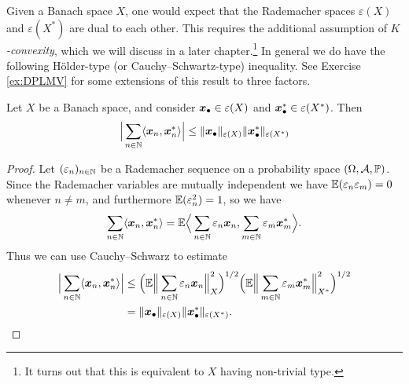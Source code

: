 Given a Banach space $X$, one would expect that the Rademacher spaces $\varepsilon(X)$ and $\varepsilon(X^{*})$ are dual to each other.
This requires the additional assumption of \emph{$K$-convexity}, which we will discuss in a later chapter.\footnote{It turns out that this is equivalent to $X$ having non-trivial type.}
In general we do have the following H\"older-type (or Cauchy--Schwartz-type) inequality.
See Exercise \ref{ex:DPLMV} for some extensions of this result to three factors.

\begin{prop}
  Let $X$ be a Banach space, and consider $\bm{x}_{\bullet} \in \varepsilon(X)$ and $\bm{x}_{\bullet}^{*} \in \varepsilon(X^{*})$.
  Then
  \begin{equation*}
    \Big| \sum_{n \in \mathbb{N}} \langle \bm{x}_{n}, \bm{x}_{n}^{*} \rangle \Big| \leq \|\bm{x}_{\bullet}\|_{\varepsilon(X)} \|\bm{x}_{\bullet}^{*}\|_{\varepsilon(X^{*})} 
  \end{equation*}
\end{prop}

\begin{proof}
  Let $(\varepsilon_{n})_{n \in \mathbb{N}}$ be a Rademacher sequence on a probability space $(\Omega,\mathcal{A},\mathbb{P})$.
  Since the Rademacher variables are mutually independent we have $\mathbb{E}(\varepsilon_{n} \varepsilon_m) = 0$ whenever $n \neq m$, and furthermore $\mathbb{E}(\varepsilon_{n}^{2}) = 1$, so we have
  \begin{equation*}
    \sum_{n \in \mathbb{N}} \langle \bm{x}_{n}, \bm{x}_{n}^{*} \rangle
    = \mathbb{E} \Big\langle \sum_{n \in \mathbb{N}} \varepsilon_{n} \bm{x}_{n}, \sum_{m \in \mathbb{N}} \varepsilon_{m} \bm{x}_{m}^{*} \Big\rangle.
  \end{equation*}
  Thus we can use Cauchy--Schwarz to estimate
    \begin{equation*}
      \begin{aligned}
        \Big|\sum_{n \in \mathbb{N}} \langle \bm{x}_{n}, \bm{x}_{n}^{*} \rangle \Big|
        &\leq \Big( \mathbb{E} \Big\| \sum_{n \in \mathbb{N}} \varepsilon_{n} \bm{x}_{n} \Big\|_{X}^{2} \Big)^{1/2} 
        \Big( \mathbb{E} \Big\| \sum_{m \in \mathbb{N}} \varepsilon_{m} \bm{x}_{m}^{*} \Big\|_{X^{*}}^{2} \Big)^{1/2} \\
        & = \|\bm{x}_{\bullet}\|_{\varepsilon(X)} \|\bm{x}_{\bullet}^{*}\|_{\varepsilon(X^{*})} .
      \end{aligned}
    \end{equation*}
\end{proof}







